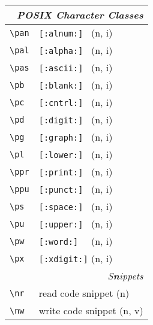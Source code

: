 \documentclass[oneside,12pt,a4paper,DIV18]{scrartcl}
\begin{document}
\begin{center}
\newpage 
\begin{tabular}[]{|p{11mm}|p{59mm}|}
\hline
\multicolumn{2}{|r|}{\textsl{\textbf{P}OSIX Character Classes}}\\
\hline \verb'\pan' &  \verb'[:alnum:] '         \hfill (n, i)   \\
\hline \verb'\pal' &  \verb'[:alpha:] '         \hfill (n, i)   \\
\hline \verb'\pas' &  \verb'[:ascii:] '         \hfill (n, i)   \\
\hline \verb'\pb'  &  \verb'[:blank:] '         \hfill (n, i)   \\
\hline \verb'\pc'  &  \verb'[:cntrl:] '         \hfill (n, i)   \\
\hline \verb'\pd'  &  \verb'[:digit:] '         \hfill (n, i)   \\
\hline \verb'\pg'  &  \verb'[:graph:] '         \hfill (n, i)   \\
\hline \verb'\pl'  &  \verb'[:lower:] '         \hfill (n, i)   \\
\hline \verb'\ppr' &  \verb'[:print:] '         \hfill (n, i)   \\
\hline \verb'\ppu' &  \verb'[:punct:] '         \hfill (n, i)   \\
\hline \verb'\ps'  &  \verb'[:space:] '         \hfill (n, i)   \\
\hline \verb'\pu'  &  \verb'[:upper:] '         \hfill (n, i)   \\
\hline \verb'\pw'  &  \verb'[:word:]  '         \hfill (n, i)   \\
\hline \verb'\px'  &  \verb'[:xdigit:]'         \hfill (n, i)   \\
\hline
\hline
\multicolumn{2}{|r|}{\textsl{S\textbf{n}ippets}} \\
\hline \verb'\nr'  & read code snippet          \hfill (n)\\
\hline \verb'\nw'  & write code snippet         \hfill (n, v)\\

\end{tabular}
\end{center}
\end{document}
